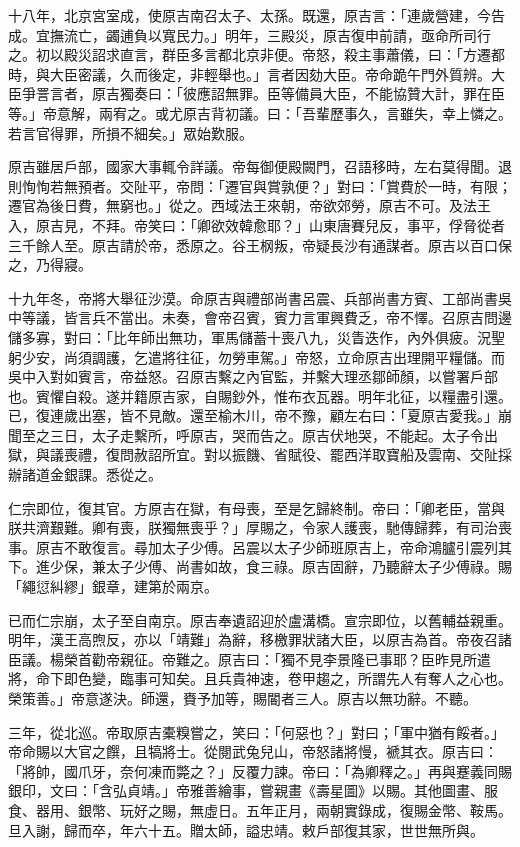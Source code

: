 \begin{pinyinscope}
十八年，北京宮室成，使原吉南召太子、太孫。既還，原吉言：「連歲營建，今告成。宜撫流亡，蠲逋負以寬民力。」明年，三殿災，原吉復申前請，亟命所司行之。初以殿災詔求直言，群臣多言都北京非便。帝怒，殺主事蕭儀，曰：「方遷都時，與大臣密議，久而後定，非輕舉也。」言者因劾大臣。帝命跪午門外質辨。大臣爭詈言者，原吉獨奏曰：「彼應詔無罪。臣等備員大臣，不能協贊大計，罪在臣等。」帝意解，兩宥之。或尤原吉背初議。曰：「吾輩歷事久，言雖失，幸上憐之。若言官得罪，所損不細矣。」眾始歎服。

原吉雖居戶部，國家大事輒令詳議。帝每御便殿闕門，召語移時，左右莫得聞。退則恂恂若無預者。交阯平，帝問：「遷官與賞孰便？」對曰：「賞費於一時，有限；遷官為後日費，無窮也。」從之。西域法王來朝，帝欲郊勞，原吉不可。及法王入，原吉見，不拜。帝笑曰：「卿欲效韓愈耶？」山東唐賽兒反，事平，俘脅從者三千餘人至。原吉請於帝，悉原之。谷王㭎叛，帝疑長沙有通謀者。原吉以百口保之，乃得寢。

十九年冬，帝將大舉征沙漠。命原吉與禮部尚書呂震、兵部尚書方賓、工部尚書吳中等議，皆言兵不當出。未奏，會帝召賓，賓力言軍興費乏，帝不懌。召原吉問邊儲多寡，對曰：「比年師出無功，軍馬儲蓄十喪八九，災眚迭作，內外俱疲。況聖躬少安，尚須調護，乞遣將往征，勿勞車駕。」帝怒，立命原吉出理開平糧儲。而吳中入對如賓言，帝益怒。召原吉繫之內官監，并繫大理丞鄒師顏，以嘗署戶部也。賓懼自殺。遂并籍原吉家，自賜鈔外，惟布衣瓦器。明年北征，以糧盡引還。已，復連歲出塞，皆不見敵。還至榆木川，帝不豫，顧左右曰：「夏原吉愛我。」崩聞至之三日，太子走繫所，呼原吉，哭而告之。原吉伏地哭，不能起。太子令出獄，與議喪禮，復問赦詔所宜。對以振饑、省賦役、罷西洋取寶船及雲南、交阯採辦諸道金銀課。悉從之。

仁宗即位，復其官。方原吉在獄，有母喪，至是乞歸終制。帝曰：「卿老臣，當與朕共濟艱難。卿有喪，朕獨無喪乎？」厚賜之，令家人護喪，馳傳歸葬，有司治喪事。原吉不敢復言。尋加太子少傅。呂震以太子少師班原吉上，帝命鴻臚引震列其下。進少保，兼太子少傅、尚書如故，食三祿。原吉固辭，乃聽辭太子少傅祿。賜「繩愆糾繆」銀章，建第於兩京。

已而仁宗崩，太子至自南京。原吉奉遺詔迎於盧溝橋。宣宗即位，以舊輔益親重。明年，漢王高煦反，亦以「靖難」為辭，移檄罪狀諸大臣，以原吉為首。帝夜召諸臣議。楊榮首勸帝親征。帝難之。原吉曰：「獨不見李景隆已事耶？臣昨見所遣將，命下即色變，臨事可知矣。且兵貴神速，卷甲趨之，所謂先人有奪人之心也。榮策善。」帝意遂決。師還，賚予加等，賜閽者三人。原吉以無功辭。不聽。

三年，從北巡。帝取原吉橐糗嘗之，笑曰：「何惡也？」對曰；「軍中猶有餒者。」帝命賜以大官之饌，且犒將士。從閱武兔兒山，帝怒諸將慢，褫其衣。原吉曰：「將帥，國爪牙，奈何凍而斃之？」反覆力諫。帝曰：「為卿釋之。」再與蹇義同賜銀印，文曰：「含弘貞靖。」帝雅善繪事，嘗親畫《壽星圖》以賜。其他圖畫、服食、器用、銀幣、玩好之賜，無虛日。五年正月，兩朝實錄成，復賜金幣、鞍馬。旦入謝，歸而卒，年六十五。贈太師，謚忠靖。敕戶部復其家，世世無所與。


\end{pinyinscope}
